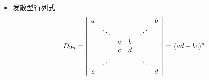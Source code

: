 \begin{frame}
  
    \begin{itemize}
    \item 发散型行列式
      $$
        D_{2n} = \left|
        \begin{array}{cccccc}
          a &     & & & & b \\
          & \ddots & & & \iddots & \\
          &   & a & b &  & \\
          &   & c & d &  &  \\
          & \iddots & & & \ddots & \\
          c &     & & & & d
        \end{array}
        \right|=(ad-bc)^n
        $$        
    \end{itemize}
  
\end{frame}



